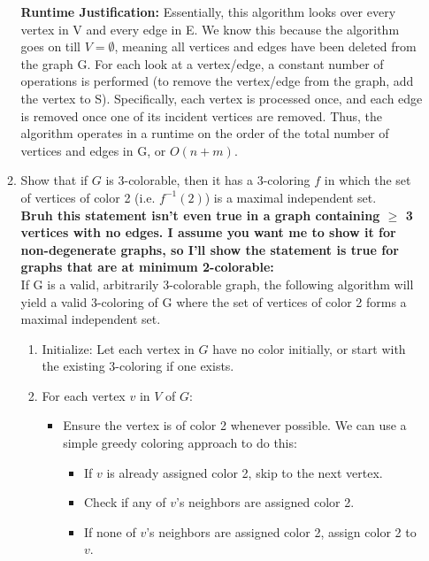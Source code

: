 \documentclass[11pt]{article}
\begin{document}
\begin{enumerate}
\begin{enumerate}
\textbf{Runtime Justification:} Essentially, this algorithm looks over every vertex in V and every edge in E. We know this because the algorithm goes on till $V = \emptyset$, meaning all vertices and edges have been deleted from the graph G. For each look at a vertex/edge, a constant number of operations is performed (to remove the vertex/edge from the graph, add the vertex to S). Specifically, each vertex is processed once, and each edge is removed once one of its incident vertices are removed. Thus, the algorithm operates in a runtime on the order of the total number of vertices and edges in G, or $O(n+m)$. \\
        
        \item Show that if $G$ is 3-colorable, then it has a 3-coloring $f$ in which the set of vertices of color 2 (i.e. $f^{-1}(2)$) is a maximal independent set. \\

\textbf{Bruh this statement isn't even true in a graph containing $\geq$ 3 vertices with no edges. I assume you want me to show it for non-degenerate graphs, so I'll show the statement is true for graphs that are at minimum 2-colorable:} \\

If G is a valid, arbitrarily 3-colorable graph, the following algorithm will yield a valid 3-coloring of G where the set of vertices of color 2 forms a maximal independent set.

\begin{enumerate}
    \item Initialize: Let each vertex in $G$ have no color initially, or start with the existing 3-coloring if one exists. 
    \item For each vertex $v$ in $V$ of $G$:
    \begin{itemize}
    \item Ensure the vertex is of color 2 whenever possible. We can use a simple greedy coloring approach to do this:
        \begin{itemize}
            \item If $v$ is already assigned color 2, skip to the next vertex.
            \item Check if any of $v$'s neighbors are assigned color 2.
            \item If none of $v$'s neighbors are assigned color 2, assign color 2 to $v$.
    \end{itemize}
    \end{itemize}
    

\end{enumerate}
\end{enumerate}
\end{enumerate}
\end{document}
